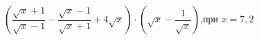 \begin{ex}[type=calculate_expression]
	\begin{condition}
		\( \left( \dfrac{\sqrt{x}+1}{\sqrt{x}-1}-\dfrac{\sqrt{x}-1}{\sqrt{x}+1}+4\sqrt{x} \right)\cdot\left( \sqrt{x}-\dfrac{1}{\sqrt{x}} \right) \),\quad при \( x=7,2 \)
	\end{condition}
\end{ex}